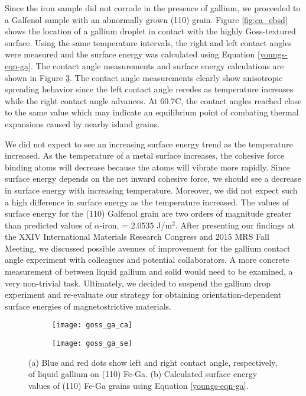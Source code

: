 Since the iron sample did not corrode in the presence of gallium, we proceeded to a Galfenol sample with an abnormally grown \hkl(110) grain. Figure \ref{fig:ca_ebsd} shows the location of a gallium droplet in contact with the highly Goss-textured surface. Using the same temperature intervals, the right and left contact angles were measured and the surface energy was calculated using Equation \ref{youngs-eqn-ga}. The contact angle measurements and surface energy calculations are shown in Figure \ref{fig:goss_se_msrmnt}. The contact angle measurements clearly show anisotropic spreading behavior since the left contact angle recedes as temperature increases while the right contact angle advances. At 60.7\degree C, the contact angles reached close to the same value which may indicate an equilibrium point of combating thermal expansions caused by nearby island grains. 

We did not expect to see an increasing surface energy trend as the temperature increased. As the temperature of a metal surface increases, the cohesive force binding atoms will decrease because the atoms will vibrate more rapidly. Since surface energy depends on the net inward cohesive force, we should see a decrease in surface energy with increasing temperature. Moreover, we did not expect such a high difference in surface energy as the temperature increased. The values of surface energy for the \hkl(110) Galfenol grain are two orders of magnitude greater than predicted values of $\alpha$-iron, \gamSV = 2.0535 J/m$^2$.\cite{Wang2000} After presenting our findings at the XXIV International Materials Research Congress and 2015 MRS Fall Meeting,\cite{VanOrder2015a,VanOrder2015} we discussed possible avenues of improvement for the gallium contact angle experiment with colleagues and potential collaborators. A more concrete measurement of \gamSL between liquid gallium and solid would need to be examined, a very non-trivial task. Ultimately, we decided to suspend the gallium drop experiment and re-evaluate our strategy for obtaining orientation-dependent surface energies of magnetostrictive materials. 

\begin{figure}[h]
	\centering
	\begin{subfigure}[c]{0.47\textwidth}
		\texttt{[image: goss\_ga\_ca]}
		\subcaption{~}
		\label{fig:goss_ga_ca}		
	\end{subfigure}
	\begin{subfigure}[c]{0.47\textwidth} 
		\texttt{[image: goss\_ga\_se]}
		\subcaption{~}
		\label{fig:goss_ga_se}		
	\end{subfigure}
	\caption{(a) Blue and red dots show left and right contact angle, respectively, of liquid gallium on \hkl(110) Fe-Ga. (b) Calculated surface energy values of \hkl(110) Fe-Ga grains using Equation \ref{youngs-eqn-ga}.}
	\label{fig:goss_se_msrmnt}
\end{figure}


